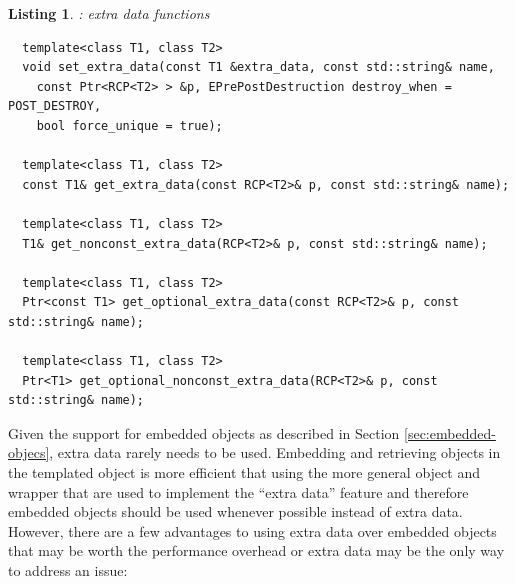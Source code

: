 \documentclass[pdf,ps2pdf,11pt]{SANDreport}
\newtheorem{listing}{Listing}
\begin{document}
\begin{listing}:  {} extra data functions \\
\label{listing:RCP-extra-data}
{\small\begin{verbatim}
  template<class T1, class T2>
  void set_extra_data(const T1 &extra_data, const std::string& name,
    const Ptr<RCP<T2> > &p, EPrePostDestruction destroy_when = POST_DESTROY,
    bool force_unique = true);
  
  template<class T1, class T2> 
  const T1& get_extra_data(const RCP<T2>& p, const std::string& name);
  
  template<class T1, class T2>
  T1& get_nonconst_extra_data(RCP<T2>& p, const std::string& name);
  
  template<class T1, class T2>
  Ptr<const T1> get_optional_extra_data(const RCP<T2>& p, const std::string& name);
  
  template<class T1, class T2>
  Ptr<T1> get_optional_nonconst_extra_data(RCP<T2>& p, const std::string& name);
\end{verbatim}}
\end{listing}

Given the support for embedded objects as described in Section
{}\ref{sec:embedded-objecs}, extra data rarely needs to be used.
Embedding and retrieving objects in the templated
{} object is more efficient that using the more
general {} object and {} wrapper that are
used to implement the ``extra data'' feature and therefore embedded
objects should be used whenever possible instead of extra data.
However, there are a few advantages to using extra data over embedded
objects that may be worth the performance overhead or extra data may
be the only way to address an issue:
\end{document}
